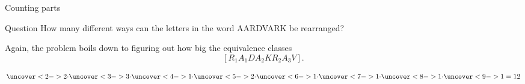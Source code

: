 \documentclass{beamer}
\def\bl[#1]#2{\begin{block}{#1}#2\end{block}}
\def\itemb{\begin{itemize}}
\def\iteme{\end{itemize}}
\begin{document}
\begin{frame}{Counting parts}
\bl[Question]{
How many different ways can the letters in the word AARDVARK be rearranged?
}
Again, the problem boils down to figuring out how big the equivalence classes
\[
[R_1A_1DA_2KR_2A_3V].
\]
\vspace{-0.4cm}
\itemb
{}
\iteme
\vspace{0.2cm}
\[
\uncover<2->{2\cdot}\uncover<3->{3\cdot}\uncover<4->{1\cdot}\uncover<5->{2\cdot}\uncover<6->{1\cdot}\uncover<7->{1\cdot}\uncover<8->{1\cdot}\uncover<9->{1=12}
\]
\end{frame}
\end{document}
